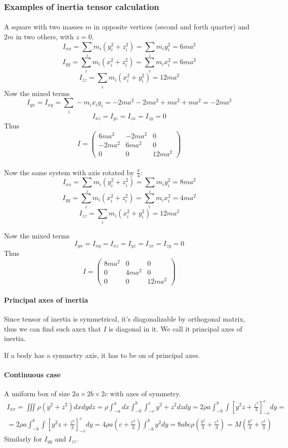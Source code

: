 \subsubsection{Examples of inertia tensor calculation}
\paragraph{}
A square with two masses $m$ in opposite vertices (second and forth quarter) and $2m$ in two others, with $z=0$.
$$I_{xx} = \sum_i m_i(y^2_i+z^2_i) = \sum_i m_i y_i^2 = 6ma^2$$
$$I_{yy} = \sum_i m_i(x^2_i+z^2_i) = \sum_i m_i x_i^2 = 6ma^2$$
$$I_{zz} = \sum_i m_i(x^2_i+y^2_i) =  12ma^2$$
Now the mixed terms
$$I_{yx} = I_{xy} = \sum_i -m_ix_iy_i = -2ma^2 -2ma^2 + ma^2 + ma^2 = -2ma^2$$
$$I_{xz} = I_{yz} = I_{zx} = I_{zy} = 0$$
Thus
$$I = \begin{pmatrix}
6ma^2&-2ma^2&0\\
-2ma^2&6ma^2&0\\
0&0&12ma^2
\end{pmatrix}$$
\paragraph{}
Now the same system with axis rotated by $\frac{\pi}{4}$:
$$I_{xx} = \sum_i m_i(y^2_i+z^2_i) = \sum_i m_i y_i^2 = 8ma^2$$
$$I_{yy} = \sum_i m_i(x^2_i+z^2_i) = \sum_i m_i x_i^2 = 4ma^2$$
$$I_{zz} = \sum_i m_i(x^2_i+y^2_i) =  12ma^2$$

Now the mixed terms
$$I_{yx} = I_{xy} = I_{xz} = I_{yz} = I_{zx} = I_{zy} = 0$$
Thus
$$I = \begin{pmatrix}
8ma^2&0&0\\
0&4ma^2&0\\
0&0&12ma^2
\end{pmatrix}$$
\paragraph{Principal axes of inertia}
Since tensor of inertia is symmetrical, it's diagonalizable by orthogonal matrix, thus we can find such axex that $I$ is diagonal in it. We call it principal axes of inertia. 

If a body has a symmetry axis, it has to be on of principal axes.
\paragraph{Continuous case}
A uniform box of size $2a\times 2b \times 2c$ with axes of symmetry. 
\begin{align*}
I_{xx} = \iiint \rho (y^2+z^2) dxdydz = \rho \int_{-a}^{a} dx \int_{-b}^b\int_{-c}^c y^2 + z^2 dz dy = 2\rho a  \int_{-b}^b\int \left[y^2z + \frac{z^3}{3}\right]_{-c}^c   dy =\\= 2\rho a  \int_{-b}^b\int \left[y^2z + \frac{z^3}{3}\right]_{-c}^c   dy = 4\rho a \left(c+\frac{c^3}{3}\right)\int_{-b}^b y^2  dy = 8abc\rho \left(\frac{b^3}{3}+\frac{c^3}{3}\right) = M\left(\frac{b^3}{3}+\frac{c^3}{3}\right)
\end{align*}
Similarly for $I_{yy}$ and $I_{zz}$.


